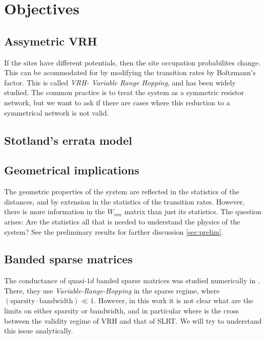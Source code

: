 \chapter{Objectives}

\section{Assymetric VRH}

If the sites have different potentials, then the site occupation probabilites change. This can be acommodated for by modifying the transition rates by Boltzmann's factor. This is called \emph{VRH- Variable Range Hopping}\cite{Ambegaokar:1971}, and has been widely studied. The common practice is to treat the system as a symmetric resistor network, but we want to ask if there are cases where this reduction to a symmetrical network is not valid.


\section{Stotland's errata model}



\section{Geometrical implications}

 The geometric properties of the system are reflected in the statistics of the distances, and by extension in the statistics of the transition rates. However, there is more information in the $W_{nm}$ matrix than just its statistics. The question arises: Are the statistics all that is needed to understand the physics of the system? See the preliminary results for farther discussion \ref{sec:prelim}.

\section{Banded sparse matrices}

The conductance of quasi-$1d$ banded sparse matrices was studied numerically in \cite{Stotland:2010:PRB}. There, they use \emph{Variable-Range-Hopping} in the sparse regime, where 
$(\text{sparsity}\cdot \text{bandwidth}) \ll 1$. However, in this work it is not clear what are the limits on either sparsity or bandwidth, and in particular where is the cross between the validity regime of VRH and that of SLRT. We will try to understand this issue analytically.


